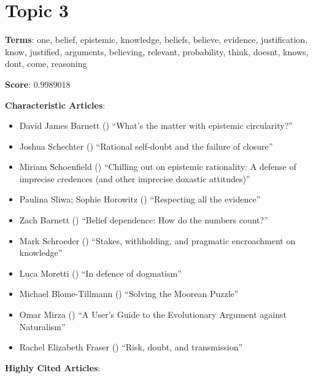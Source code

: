 \documentclass[
  10pt,
  letterpaper,
  DIV=11,
  numbers=noendperiod,
  twoside]{scrartcl}
\providecommand{\tightlist}{%
  \setlength{\itemsep}{0pt}\setlength{\parskip}{0pt}}\usepackage{longtable,booktabs,array}
\begin{document}
\section{Topic 3}\label{topic-3}

\textbf{Terms}: one, belief, epistemic, knowledge, beliefs, believe,
evidence, justification, know, justified, arguments, believing,
relevant, probability, think, doesnt, knows, dont, come, reasoning

\textbf{Score}: 0.9989018

\textbf{Characteristic Articles}:

\begin{itemize}
\tightlist
\item
  David James Barnett () ``What's
  the matter with epistemic circularity?''
\item
  Joshua Schechter () ``Rational
  self-doubt and the failure of closure''
\item
  Miriam Schoenfield ()
  ``Chilling out on epistemic rationality: A defense of imprecise
  credences (and other imprecise doxastic attitudes)''
\item
  Paulina Sliwa; Sophie Horowitz
  () ``Respecting all the
  evidence''
\item
  Zach Barnett () ``Belief
  dependence: How do the numbers count?''
\item
  Mark Schroeder () ``Stakes,
  withholding, and pragmatic encroachment on knowledge''
\item
  Luca Moretti () ``In defence of
  dogmatism''
\item
  Michael Blome-Tillmann ()
  ``Solving the Moorean Puzzle''
\item
  Omar Mirza () ``A User's Guide
  to the Evolutionary Argument against Naturalism''
\item
  Rachel Elizabeth Fraser
  ()
  ``Risk, doubt, and transmission''
\end{itemize}

\textbf{Highly Cited Articles}:
\end{document}
